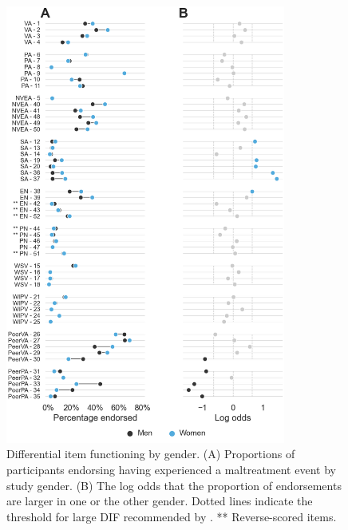 \documentclass[letterpaper,man,natbib,noextraspace,floatsintext,longtable,12pt]{apa6}
\begin{document}
\begin{figure}[H]
    \centering
    \includegraphics[width=0.82\textwidth,center]{figures/figS02.png}
    \caption{\normalfont Differential item functioning by gender. (A) Proportions of participants endorsing having experienced a maltreatment event by study gender. (B) The log odds that the proportion of endorsements are larger in one or the other gender. Dotted lines indicate the threshold for large DIF recommended by \cite{hidalgo2014binary}. ** Reverse-scored items.}
    \label{fig:dif_gender}
\end{figure}
\end{document}
